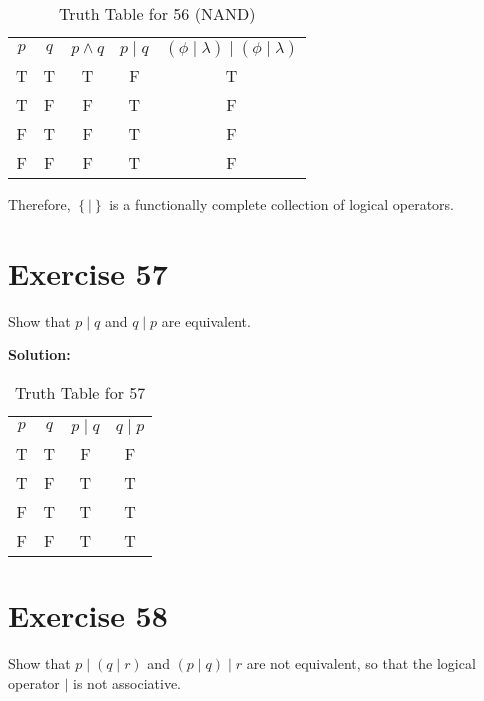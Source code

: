 \documentclass{Axon}
\begin{document}
\begin{table}[ht]
\centering
\begin{tabular}{c|c|c|c|c}
    \(p\) & \(q\) & \(p \land q\) & \(p \mathbin{\mid} q\) & \(\left(\phi \mathbin{\mid} \lambda\right) \mathbin{\mid} \left(\phi \mathbin{\mid} \lambda\right)\) \\
    T     & T     & T             & F                      & T                                                                                                    \\
    T     & F     & F             & T                      & F                                                                                                    \\
    F     & T     & F             & T                      & F                                                                                                    \\
    F     & F     & F             & T                      & F
\end{tabular}
\caption{Truth Table for 56 (NAND)}
\label{Truth Table for 56 (NAND)}
\end{table}

Therefore, \(\left\{\mathbin{\mid}\right\}\) is a functionally complete collection of logical operators.

\section*{Exercise 57}
Show that \(p \mathbin{\mid} q\) and \(q \mathbin{\mid} p\) are equivalent.

\noindent
\textbf{Solution:}
\begin{table}[ht]
\centering
\begin{tabular}{c|c|c|c}
    \(p\) & \(q\) & \(p \mathbin{\mid} q\) & \(q \mathbin{\mid} p\) \\
    T     & T     & F                      & F                      \\
    T     & F     & T                      & T                      \\
    F     & T     & T                      & T                      \\
    F     & F     & T                      & T
\end{tabular}
\caption{Truth Table for 57}
\end{table}

\section*{Exercise 58}
Show that \(p \mathbin{\mid} \left(q \mathbin{\mid} r\right)\) and \(\left(p \mathbin{\mid} q\right) \mathbin{\mid} r\) are not equivalent, so that the logical operator \(\mathbin{\mid}\) is not associative.

\printbibliography
\end{document}
